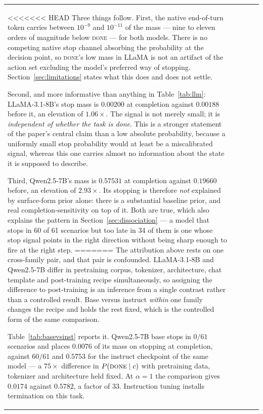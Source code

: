\documentclass[11pt]{article}
\newcommand{\done}{\ensuremath{\text{\textsc{done}}}}
\begin{document}
\begin{table}[t]
\begin{tabular}{lcccc}
<<<<<<< HEAD
Three things follow. First, the native end-of-turn token carries between
$10^{-9}$ and $10^{-11}$ of the mass --- nine to eleven orders of magnitude below
\textsc{done} --- for both models. There is no competing native stop channel
absorbing the probability at the decision point, so \textsc{done}'s low mass in
LLaMA is not an artifact of the action set excluding the model's preferred way of
stopping. Section~\ref{sec:limitations} states what this does and does not settle.

Second, and more informative than anything in Table~\ref{tab:llm}: LLaMA-3.1-8B's
stop mass is $0.00200$ at completion against $0.00188$ before it, an elevation of
$1.06\times$. The signal is not merely small; it is \emph{independent of whether
the task is done}. This is a stronger statement of the paper's central claim than
a low absolute probability, because a uniformly small stop probability would at
least be a miscalibrated signal, whereas this one carries almost no information
about the state it is supposed to describe.

Third, Qwen2.5-7B's mass is $0.57531$ at completion against $0.19660$ before,
an elevation of $2.93\times$. Its stopping is therefore \emph{not} explained by
surface-form prior alone: there is a substantial baseline prior, and real
completion-sensitivity on top of it. Both are true, which also explains the
pattern in Section~\ref{sec:dissociation} --- a model that stops in 60 of 61
scenarios but too late in 34 of them is one whose stop signal points in the right
direction without being sharp enough to fire at the right step.
=======
The attribution above rests on one cross-family pair, and that pair is confounded.
LLaMA-3.1-8B and Qwen2.5-7B differ in pretraining corpus, tokenizer, architecture,
chat template and post-training recipe simultaneously, so assigning the difference
to post-training is an inference from a single contrast rather than a controlled
result. Base versus instruct \emph{within} one family changes the recipe and holds
the rest fixed, which is the controlled form of the same comparison.

Table~\ref{tab:basevsinst} reports it. Qwen2.5-7B base stops in $0/61$ scenarios
and places $0.0076$ of its mass on stopping at completion, against $60/61$ and
$0.5753$ for the instruct checkpoint of the same model --- a $75\times$ difference
in $P(\done \mid c)$ with pretraining data, tokenizer and architecture held fixed.
At $\alpha=1$ the comparison gives $0.0174$ against $0.5782$, a factor of $33$.
Instruction tuning installs termination on this task.


\end{tabular}
\end{table}
\end{document}
